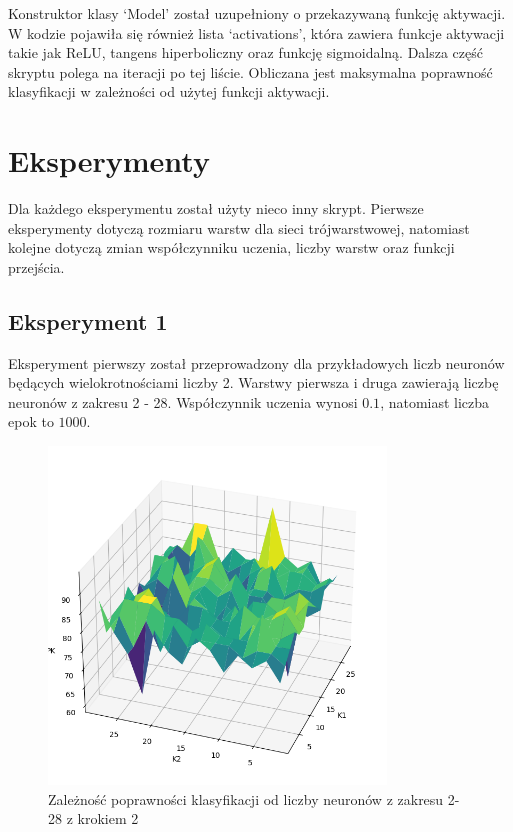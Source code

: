 \documentclass{article}
\begin{document}
Konstruktor klasy `Model' został uzupełniony o przekazywaną funkcję aktywacji.
W kodzie pojawiła się również lista `activations', która zawiera funkcje aktywacji takie jak ReLU, tangens hiperboliczny oraz funkcję sigmoidalną.
Dalsza część skryptu polega na iteracji po tej liście.
Obliczana jest maksymalna poprawność klasyfikacji w zależności od użytej funkcji aktywacji.

\newpage
\section{Eksperymenty}
Dla każdego eksperymentu został użyty nieco inny skrypt.
Pierwsze eksperymenty dotyczą rozmiaru warstw dla sieci trójwarstwowej, natomiast kolejne dotyczą zmian współczynniku uczenia, liczby warstw oraz funkcji przejścia.

\newpage
\subsection{Eksperyment 1}

Eksperyment pierwszy został przeprowadzony dla przykładowych liczb neuronów będących wielokrotnościami liczby 2.
Warstwy pierwsza i druga zawierają liczbę neuronów z zakresu 2 - 28.
Współczynnik uczenia wynosi $0.1$, natomiast liczba epok to $1000$.

\begin{figure}[H]
    \centering
    \includegraphics[width=0.8\textwidth, keepaspectratio]{k1_k2_dobre_1_1000echo.png}
    \caption{Zależność poprawności klasyfikacji od liczby neuronów z zakresu 2-28 z krokiem 2}
    \label{fig:k1k2_1}
\end{figure}
\end{document}
